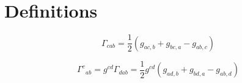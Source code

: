\section{Definitions}

\begin{equation}
\Gamma_{cab} = \frac{1}{2}\left(g_{ac,b} + g_{bc,a} - g_{ab,c}\right)
\end{equation}

\begin{equation}
\Gamma^{c}_{\;\;ab} = g^{cd}\Gamma_{dab} = \frac{1}{2} g^{cd} \left(g_{ad,b} + g_{bd,a} - g_{ab,d}\right)
\end{equation}


